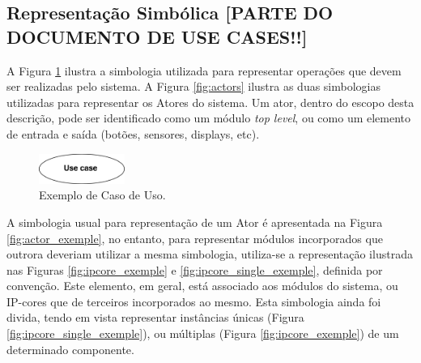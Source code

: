 \documentclass{article}
\begin{document}
  \subsection{Representação Simbólica [PARTE DO DOCUMENTO DE USE CASES!!]}
  A Figura \ref{fig:uc_exemple} ilustra a simbologia utilizada para representar operações que devem ser realizadas pelo sistema. A Figura \ref{fig:actors} ilustra as duas simbologias utilizadas para representar os Atores do sistema. Um ator, dentro do escopo desta descrição, pode ser identificado como um módulo \textit{top level}, ou como um elemento de entrada e saída (botões, sensores, displays, etc).
  
  \FloatBarrier
  \begin{figure}[H]
    \centering
    \includegraphics[width=0.25\textwidth]{uc_exemple.png}
    \caption{Exemplo de Caso de Uso.}
    \label{fig:uc_exemple}
  \end{figure}  
  
  A simbologia usual para representação de um Ator é apresentada na Figura \ref{fig:actor_exemple}, no entanto, para representar módulos incorporados que outrora deveriam utilizar a mesma simbologia, utiliza-se a representação ilustrada nas Figuras \ref{fig:ipcore_exemple} e \ref{fig:ipcore_single_exemple}, definida por convenção. Este elemento, em geral, está associado aos módulos do sistema, ou IP-cores que de terceiros incorporados ao mesmo. Esta simbologia ainda foi divida, tendo em vista representar instâncias únicas (Figura \ref{fig:ipcore_single_exemple}), ou múltiplas (Figura \ref{fig:ipcore_exemple}) de um determinado componente. 
  
\end{document}
